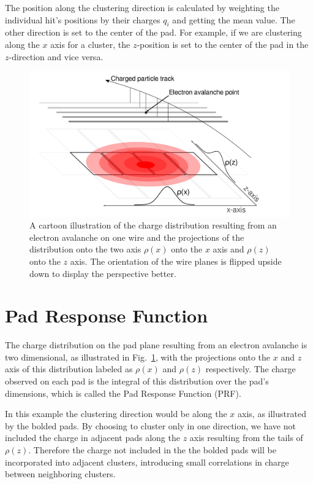 \documentclass[review]{elsarticle}
\begin{document}
 The position along the clustering direction is calculated by weighting the individual hit's positions by their charges $q_i$ and getting the mean value. The other direction is set to the center of the pad. For example, if we are clustering along the $x$ axis for a cluster, the $z$-position is set to the center of the pad in the $z$-direction and vice versa. 
 


\begin{figure}[ht!]
\includegraphics[width=\linewidth]{padsat_Large}
\caption{A cartoon illustration of the charge distribution resulting from an electron avalanche on one wire and the projections of the distribution onto the two axis $\rho(x)$ onto the $x$ axis and $\rho(z)$ onto the $z$ axis. The orientation of the wire planes is flipped upside down to display the perspective better.}
\label{fig:prf}
\end{figure}

\section{Pad Response Function}
The charge distribution on the pad plane resulting from an electron avalanche is two dimensional, as illustrated in Fig.~\ref{fig:prf}, with the projections onto the $x$ and $z$ axis of this distribution labeled as $\rho(x)$ and $\rho(z)$ respectively. The charge observed on each pad is the integral of this distribution over the pad's dimensions, which is called the Pad Response Function (PRF).

In this example the clustering direction would be along the $x$ axis, as illustrated by the bolded pads. By choosing to cluster only in one direction, we have not included the charge in adjacent pads along the $z$ axis resulting from the tails of $\rho(z)$. Therefore the charge not included in the the bolded pads will be incorporated into adjacent clusters, introducing small correlations in charge between neighboring clusters. 
\end{document}

